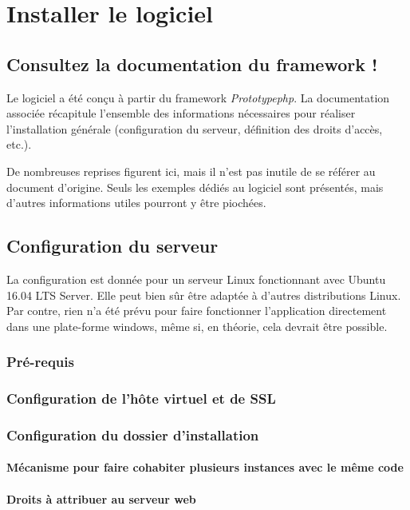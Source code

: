 \chapter{Installer le logiciel}

\section{Consultez la documentation du framework !}

Le logiciel a été conçu à partir du framework \textit{Prototypephp}. La documentation associée récapitule l'ensemble des informations nécessaires pour réaliser l'installation générale (configuration du serveur, définition des droits d'accès, etc.).

De nombreuses reprises figurent ici, mais il n'est pas inutile de se référer au document d'origine. Seuls les exemples dédiés au logiciel sont présentés, mais d'autres informations utiles pourront y être piochées.

\section{Configuration du serveur}
La configuration est donnée pour un serveur Linux fonctionnant avec Ubuntu 16.04 LTS Server. Elle peut bien sûr être adaptée à d'autres distributions Linux. Par contre, rien n'a été prévu pour faire fonctionner l'application directement dans une plate-forme windows, même si, en théorie, cela devrait être possible.

\subsection{Pré-requis}

\subsection{Configuration de l'hôte virtuel et de SSL}

\subsection{Configuration du dossier d'installation}

\subsubsection{Mécanisme pour faire cohabiter plusieurs instances avec le même code}

\subsubsection{Droits à attribuer au serveur web}